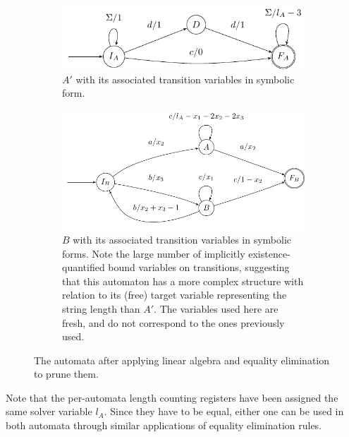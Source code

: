 \begin{figure}[h]
    \centering 
  \begin{subfigure}[b]{\autscale\textwidth}
    \centering
    \includegraphics[width=\textwidth]{a_annotated}
    \caption{ $A'$ with its associated transition variables in symbolic
    form.}\label{fig:aut_a_annotated}
  \end{subfigure}\hfill%
  \begin{subfigure}[b]{\autscale\textwidth}
    \centering
    \includegraphics[width=\textwidth]{b_annotated}
    \caption{$B$ with its associated transition variables in symbolic forms.
    Note the large number of implicitly existence-quantified bound variables on
    transitions, suggesting that this automaton has a more complex structure
    with relation to its (free) target variable representing the string length
    than $A'$. The variables used here are fresh, and do not correspond to the
    ones previously used.}\label{fig:aut_b_annotated}
  \end{subfigure}
  \caption{The automata after applying linear algebra and equality elimination
  to prune them.}\label{fig:propagated}
\end{figure}


Note that the per-automata length counting registers have been assigned the same
solver variable $l_A$. Since they have to be equal, either one can be used in
both automata through similar applications of equality elimination rules.

